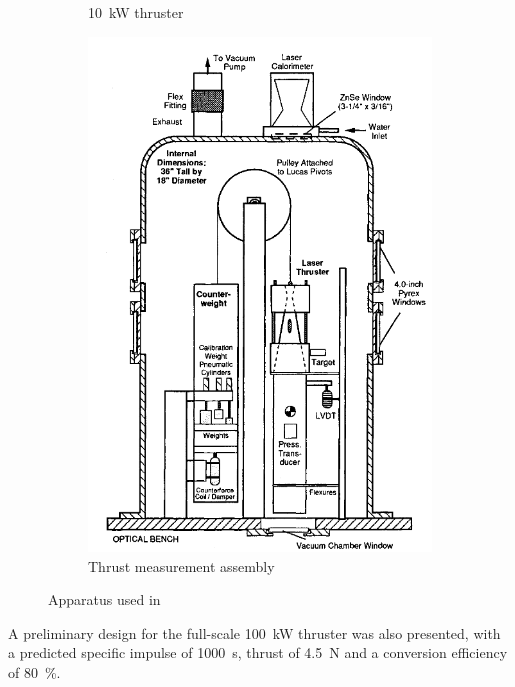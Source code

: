 \begin{figure}[!ht]
\begin{subfigure}[t]{0.3\textwidth}
                \caption{\qty{10}{kW} thruster}
                \label{fig:Black apparatus}
            \end{subfigure}
            \hfill
            \begin{subfigure}[t]{0.45\textwidth}
                \centering
                \includegraphics[width=\textwidth]{assets/2 background/Black thrust measurement assy.png}
                \caption{Thrust measurement assembly}
                \label{fig:Black thrust measurement}
            \end{subfigure}
            \caption{Apparatus used in \textcite{blackLaserPropulsion10kW1995}}
            \label{fig:Black apparatussies}
        \end{figure}
        A preliminary design for the full-scale \qty{100}{kW} thruster was also presented, with a predicted specific impulse of \qty{1000}{s}, thrust of \qty{4.5}{N} and a conversion efficiency of \qty{80}{\%}.

